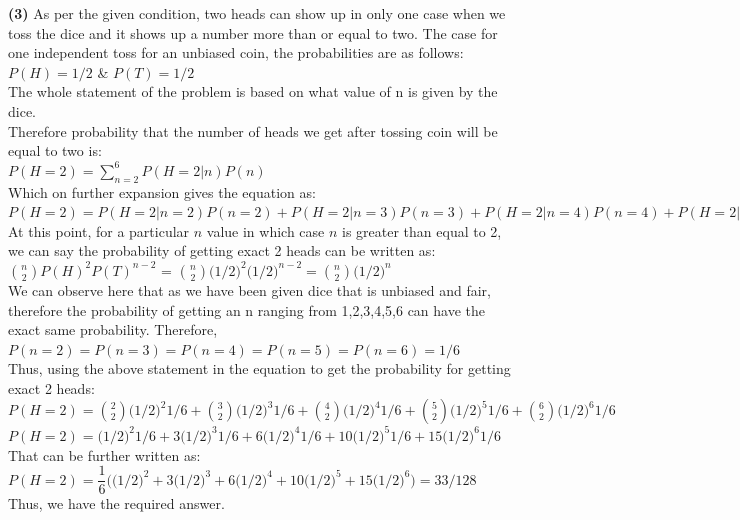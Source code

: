 \documentclass[11pt]{article}
\renewcommand\part[1]{\vspace{.10in}\textbf{(#1)}}
\begin{document}
\part{3}
As per the given condition, two heads can show up in only one case when we toss the dice and it shows up a number more than or equal to two. The case for one independent toss for an unbiased coin, the probabilities are as follows:\\
$P(H) = {1}/{2}$ \& $P(T) = {1}/{2}$\\
The whole statement of the problem is based on what value of n is given by the dice.\\
Therefore probability that the number of heads we get after tossing coin will be equal to two is:\\
$P(H=2) = \sum_{n=2}^6P(H=2|n)P(n)$\\
Which on further expansion gives the equation as:\\
$P(H=2) = P(H=2|n=2)P(n=2) + P(H=2|n=3)P(n=3) + P(H=2|n=4)P(n=4) + P(H=2|n=5)P(n=5 ) + P(H=2|n=6)P(n=6)$\\

At this point, for a particular $n$ value in which case $n$ is greater than equal to 2, we can say the probability of getting exact 2 heads can be written as:\\ 
$\binom{n}{2} P(H)^2P(T)^{n-2}$ = $\binom{n}{2}\bigg ({1}/{2} \bigg )^2 \bigg ( {1}/{2} \bigg)^{n-2} = \binom{n}{2}\bigg ( {1}/{2} \bigg)^n$\\

We can observe here that as we have been given dice that is unbiased and fair, therefore the probability of getting an n ranging from 1,2,3,4,5,6 can have the exact same probability. Therefore,
$P(n=2) = P(n=3) = P(n=4) = P(n=5) = P(n=6) = {1}/{6}$\\
Thus, using the above statement in the equation to get the probability for getting exact 2 heads:\\
$P(H=2) = \binom{2}{2}\bigg ( {1}/{2} \bigg )^2{1}/{6} + \binom{3}{2}\bigg ( {1}/{2} \bigg )^3{1}/{6} + \binom{4}{2}\bigg ( {1}/{2} \bigg )^4{1}/{6} + \binom{5}{2}\bigg ( {1}/{2} \bigg )^5{1}/{6} + \binom{6}{2}\bigg ( {1}/{2} \bigg )^6{1}/{6}$\\
$P(H=2) = \bigg ( {1}/{2} \bigg )^2{1}/{6} + 3\bigg ({1}/{2} \bigg )^3{1}/{6} + 6\bigg ({1}/{2} \bigg )^4{1}/{6} + 10\bigg ({1}/{2} \bigg )^5{1}/{6} + 15\bigg ({1}/{2} \bigg )^6{1}/{6}$\\
That can be further written as:\\
$P(H=2) = \dfrac{1}{6} \bigg (\bigg ({1}/{2} \bigg )^2 + 3\bigg ({1}/{2} \bigg )^3 + 6\bigg ({1}/{2} \bigg )^4 + 10\bigg ({1}/{2} \bigg )^5 + 15\bigg ({1}/{2} \bigg )^6 \bigg ) = {33}/{128}$\\
Thus, we have the required answer.\\
\end{document}
